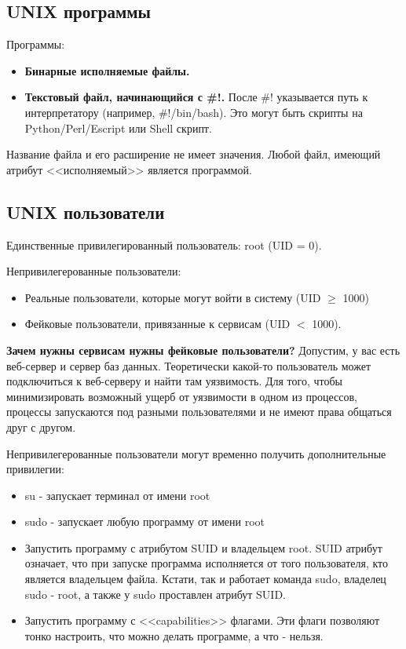 \subsection{UNIX программы}

Программы:
\begin{itemize}
	\item \textbf{Бинарные исполняемые файлы.}
	\item \textbf{Текстовый файл, начинающийся с \#!.} После \#! указывается путь к интерпретатору (например, \#!/bin/bash). Это могут быть скрипты на Python/Perl/Escript или Shell скрипт.
\end{itemize}

Название файла и его расширение не имеет значения. Любой файл, имеющий атрибут 
<<исполняемый>> является программой.

\subsection{UNIX пользователи}

Единственные привилегированный пользователь: root (UID = 0).

Непривилегерованные пользователи:
\begin{itemize}
	\item Реальные пользователи, которые могут войти в систему (UID $\ge$ 1000)
	\item Фейковые пользователи, привязанные к сервисам (UID $<$ 1000).
\end{itemize}

\textbf{Зачем нужны сервисам нужны фейковые пользователи?}
Допустим, у вас есть веб-сервер и сервер баз данных. Теоретически какой-то пользователь
может подключиться к веб-серверу и найти там уязвимость. Для того, чтобы 
минимизировать возможный ущерб от уязвимости в одном из процессов, процессы запускаются
под разными пользователями и не имеют права общаться друг с другом.

Непривилегерованные пользователи могут временно получить 
дополнительные привилегии:
\begin{itemize}
	\item su - запускает терминал от имени root
	\item sudo - запускает любую программу от имени root
	\item Запустить программу с атрибутом SUID и владельцем root. SUID атрибут означает, что при запуске программа
	исполняется от того пользователя, кто является владельцем файла. Кстати, так и 
	работает команда sudo, владелец sudo - root, а также у sudo проставлен атрибут SUID.
	\item Запустить программу с <<capabilities>> флагами. Эти флаги позволяют тонко настроить, что можно делать программе, а что - нельзя.
\end{itemize}

